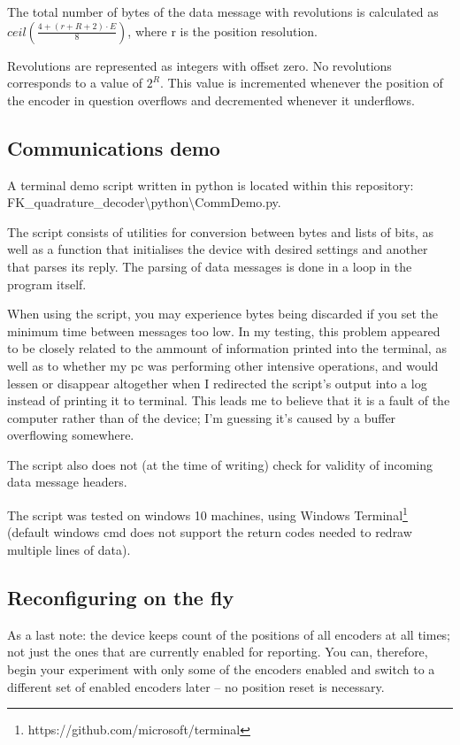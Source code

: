 \documentclass[twoside]{article}
\begin{document}
The total number of bytes of the data message with revolutions is calculated as  $ceil(\frac{4+(r+R+2)\cdot{}E}{8})$, where r is the position resolution. 

Revolutions are represented as integers with offset zero. No revolutions corresponds to a value of $2^R$. This value is incremented whenever the position of the encoder in question overflows and decremented whenever it underflows.




\subsection{Communications demo}

\noindent{}A terminal demo script written in python is located within this repository:\\ FK\_quadrature\_decoder\textbackslash{}python\textbackslash{}CommDemo.py.

The script consists of utilities for conversion between bytes and lists of bits, as well as a function that initialises the device with desired settings and another that parses its reply. The parsing of data messages is done in a loop in the program itself.

When using the script, you may experience bytes being discarded if you set the minimum time between messages too low. In my testing, this problem appeared to be closely related to the ammount of information printed into the terminal, as well as to whether my pc was performing other intensive operations, and would lessen or disappear altogether when I redirected the script's output into a log instead of printing it to terminal. This leads me to believe that it is a fault of the computer rather than of the device; I'm guessing it's caused by a buffer overflowing somewhere. 

The script also does not (at the time of writing) check for validity of incoming data message headers.

The script was tested on windows 10 machines, using Windows Terminal\footnote{https://github.com/microsoft/terminal} (default windows cmd does not support the return codes needed to redraw multiple lines of data).

\subsection{Reconfiguring on the fly}

As a last note: the device keeps count of the positions of all  encoders at all times; not just the ones that are currently enabled for reporting. You can, therefore, begin your experiment with only some of the encoders enabled and switch to a different set of enabled encoders later -- no position reset is necessary.
\end{document}
